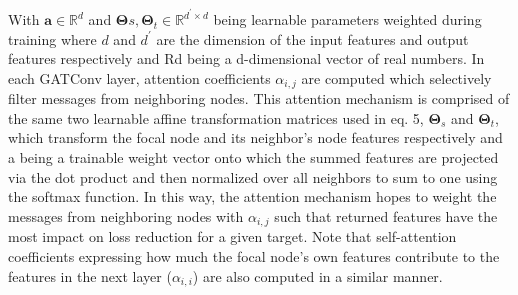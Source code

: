 With $\mathbf{a} \in \mathbb{R}^{d}$ and $\mathbf{\Theta}{s}, \mathbf{\Theta}_{t} \in \mathbb{R}^{d^{\prime} \times d}$ being learnable parameters weighted during training where $d$ and $d^{\prime}$ are the dimension of the input features and output features respectively and Rd being a d-dimensional vector of real numbers. In each GATConv layer, attention coefficients $\alpha_{i,j}$ are computed which selectively filter messages from neighboring nodes. This attention mechanism is comprised of the same two learnable affine transformation matrices used in eq. 5, $\mathbf{\Theta}_{s}$ and $\mathbf{\Theta}_{t}$, which transform the focal node and its neighbor’s node features respectively and a being a trainable weight vector onto which the summed features are projected via the dot product and then normalized over all neighbors to sum to one using the softmax function. In this way, the attention mechanism hopes to weight the messages from neighboring nodes with $\alpha_{i,j}$ such that returned features have the most impact on loss reduction for a given target. Note that self-attention coefficients expressing how much the focal node’s own features contribute to the features in the next layer ($\alpha_{i,i}$) are also computed in a similar manner.

